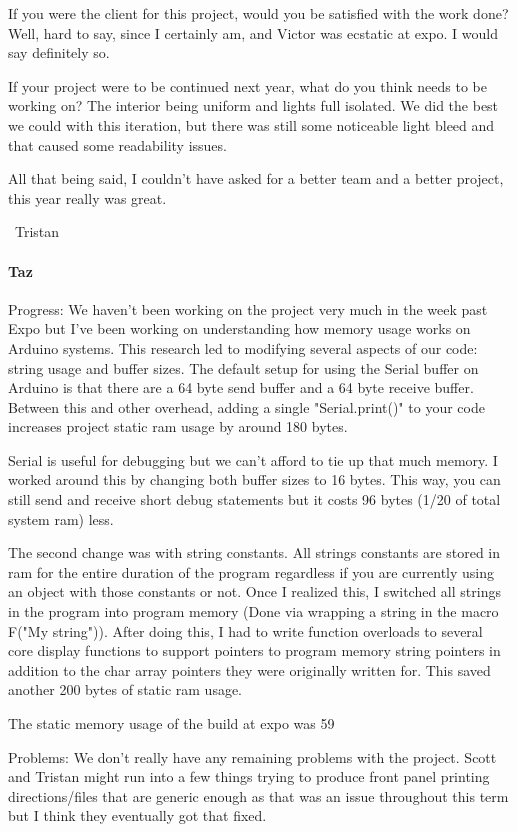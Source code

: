 \documentclass[onecolumn, draftclsnofoot,10pt, compsoc]{IEEEtran}
\begin{document}
If you were the client for this project, would you be satisfied with the work done? Well, hard to say, since I certainly am, and Victor was ecstatic at expo. I would say definitely so.

If your project were to be continued next year, what do you think needs to be working on? The interior being uniform and lights full isolated. We did the best we could with this iteration, but there was still some noticeable light bleed and that caused some readability issues.

All that being said, I couldn't have asked for a better team and a better project, this year really was great.

~Tristan
\paragraph{Taz}
Progress: We haven't been working on the project very much in the week past Expo but I've been working on understanding how memory usage works on Arduino systems. This research led to modifying several aspects of our code: string usage and buffer sizes. The default setup for using the Serial buffer on Arduino is that there are a 64 byte send buffer and a 64 byte receive buffer. Between this and other overhead, adding a single "Serial.print()" to your code increases project static ram usage by around 180 bytes.

Serial is useful for debugging but we can't afford to tie up that much memory. I worked around this by changing both buffer sizes to 16 bytes. This way, you can still send and receive short debug statements but it costs 96 bytes (1/20 of total system ram) less.

The second change was with string constants. All strings constants are stored in ram for the entire duration of the program regardless if you are currently using an object with those constants or not. Once I realized this, I switched all strings in the program into program memory (Done via wrapping a string in the macro F("My string")). After doing this, I had to write function overloads to several core display functions to support pointers to program memory string pointers in addition to the char array pointers they were originally written for. This saved another 200 bytes of static ram usage.

The static memory usage of the build at expo was 59%

Problems: We don't really have any remaining problems with the project. Scott and Tristan might run into a few things trying to produce front panel printing directions/files that are generic enough as that was an issue throughout this term but I think they eventually got that fixed.
\end{document}
